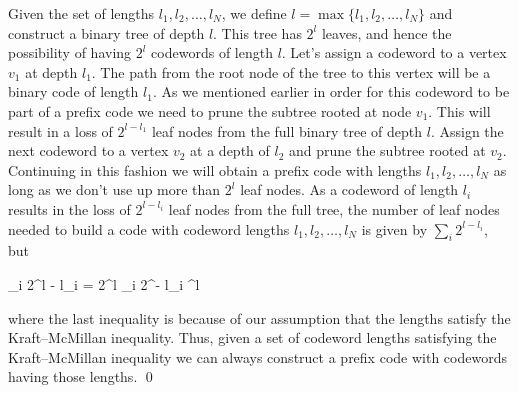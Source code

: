 Given the set of lengths $l_1, l_2, \ldots, l_N$, we define $l = \max\{ l_1, l_2, \ldots ,l_N \}$ and construct a binary tree of depth $l$. This tree has $2^l$ leaves, and hence the possibility of having $2^l$ codewords of length $l$. Let’s assign a codeword to a vertex $v_1$ at depth $l_1$. The path from the root node of the tree to this vertex will be a binary code of length $l_1$. As we mentioned earlier in order for this codeword to be part of a prefix code we need to prune the subtree rooted at node $v_1$. This will result in a loss of $2^{l - l_1}$ leaf nodes from the full binary tree of depth $l$. Assign the next codeword to a vertex $v_2$ at a depth of $l_2$ and prune the subtree rooted at $v_2$. Continuing in this fashion we will obtain a prefix code with lengths $l_1, l_2, \ldots, l_N$ as long as we don’t use up more than $2^l$ leaf nodes. As a codeword of length $l_i$ results in the loss of $2^{l - l_i}$ leaf nodes from the full tree, the number of leaf nodes needed to build a code with codeword lengths $l_1, l_2, \ldots, l_N$ is given by $\sum_i 2^{l - l_i}$, but

\bee
\sum_i 2^{l - l_i} = 2^l \sum_i 2^{- l_i} ^l
\eee

where the last inequality is because of our assumption that the lengths satisfy the Kraft–McMillan inequality. Thus, given a set of codeword lengths satisfying the Kraft–McMillan inequality we can always construct a prefix code with codewords having those lengths. \qed

